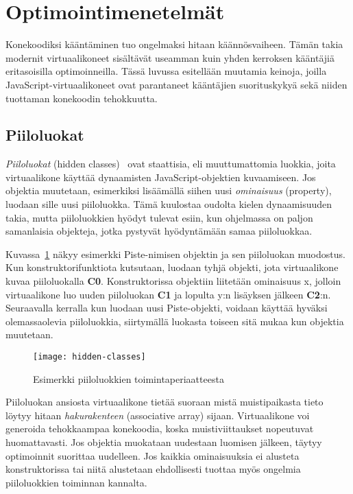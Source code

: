 \section{Optimointimenetelmät}

Konekoodiksi kääntäminen tuo ongelmaksi hitaan käännösvaiheen. Tämän takia modernit virtuaalikoneet sisältävät useamman kuin yhden kerroksen kääntäjiä eritasoisilla optimoinneilla. Tässä luvussa esitellään muutamia keinoja, joilla JavaScript-virtuaalikoneet ovat parantaneet kääntäjien suorituskykyä sekä niiden tuottaman konekoodin tehokkuutta.

\subsection{Piiloluokat}

\textit{Piiloluokat} (hidden classes)~\cite{v8design} ovat staattisia, eli muuttumattomia luokkia, joita virtuaalikone käyttää dynaamisten JavaScript-objektien kuvaamiseen. Jos objektia muutetaan, esimerkiksi lisäämällä siihen uusi \textit{ominaisuus} (property), luodaan sille uusi piiloluokka. Tämä kuulostaa oudolta kielen dynaamisuuden takia, mutta piiloluokkien hyödyt tulevat esiin, kun ohjelmassa on paljon samanlaisia objekteja, jotka pystyvät hyödyntämään samaa piiloluokkaa.

Kuvassa~\ref{fig:hiddenclass} näkyy esimerkki Piste-nimisen objektin ja sen piiloluokan muodostus. Kun konstruktorifunktiota kutsutaan, luodaan tyhjä objekti, jota virtuaalikone kuvaa piiloluokalla \textbf{C0}. Konstruktorissa objektiin liitetään ominaisuus x, jolloin virtuaalikone luo uuden piiloluokan \textbf{C1} ja lopulta y:n lisäyksen jälkeen \textbf{C2}:n. Seuraavalla kerralla kun luodaan uusi Piste-objekti, voidaan käyttää hyväksi olemassaolevia piiloluokkia, siirtymällä luokasta toiseen sitä mukaa kun objektia muutetaan.

\begin{figure}[ht]
    \texttt{[image: hidden-classes]}
    \caption{Esimerkki piiloluokkien toimintaperiaatteesta}
     \centering
     \label{fig:hiddenclass}
\end{figure}

Piiloluokan ansiosta virtuaalikone tietää suoraan mistä muistipaikasta tieto löytyy hitaan \textit{hakurakenteen} (associative array) sijaan. Virtuaalikone voi generoida tehokkaampaa konekoodia, koska muistiviittaukset nopeutuvat huomattavasti. Jos objektia muokataan uudestaan luomisen jälkeen, täytyy optimoinnit suorittaa uudelleen. Jos kaikkia ominaisuuksia ei alusteta konstruktorissa tai niitä alustetaan ehdollisesti tuottaa myös ongelmia piiloluokkien toiminnan kannalta.

